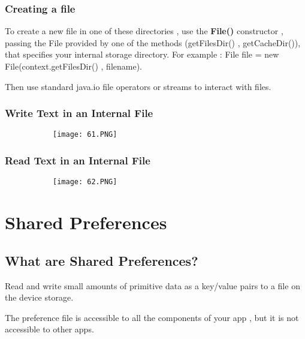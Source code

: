 \documentclass{article}
\begin{document}
\subsubsection{Creating a file}

To create a new file in one of these directories , use the \textbf{File()} constructor , passing the File provided by one of the methods (getFilesDir() , getCacheDir()), that specifies your internal storage directory. For example : File file = new File(context.getFilesDir() , filename).

Then use standard java.io file operators or streams to interact with files.

\subsubsection{Write Text in an Internal File}

      \begin{figure}[ht!]
  \centering
  \begin{subfigure}[b]{0.8\linewidth}
  \texttt{[image: 61.PNG]}
  \end{subfigure}
  \end{figure}


\subsubsection{Read Text in an Internal File}

      \begin{figure}[ht!]
  \centering
  \begin{subfigure}[b]{0.8\linewidth}
  \texttt{[image: 62.PNG]}
  \end{subfigure}
  \end{figure}


\section{Shared Preferences}

\subsection{What are Shared Preferences?}

Read and write small amounts of primitive data as a key/value pairs to a file on the device storage.

The preference file is accessible to all the components of your app , but it is not accessible to other apps.
\end{document}
